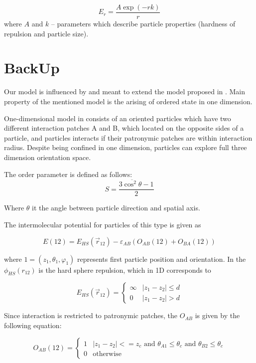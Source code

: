 \documentclass[12pt,a4paper]{article}
\begin{document}
\begin{equation}
E_{r} = \frac{A \exp(-r k)}{r}
\end{equation}
where $A$ and $k$ -- parameters which describe particle properties (hardness of repulsion and particle size).

\section{BackUp}
Our model is influenced by and meant to extend the model proposed in \cite{Marshall2015}. Main property of the mentioned model is the arising of ordered state in one dimension.

One-dimensional model in \cite{Marshall2015} consists of an oriented particles which have two different interaction patches A and B, which located on the opposite sides of a particle, and particles interacts if their patronymic patches are within interaction radius. Despite being confined in one dimension, particles can explore full three dimension orientation space.

The order parameter is defined as follows:
\begin{equation}
S = \frac{3 \overline{\cos^2 \theta} - 1}{2}
\end{equation}

Where $\theta$ it the angle between particle direction and spatial axis.

The intermolecular potential for particles of this type is given as

\begin{equation}
E(12) = E_{HS}(\vec{r}_{12}) - \varepsilon_{AB}(O_{AB}(12) + O_{BA}(12))
\end{equation}

where $1 = (z_1, \theta_1, \varphi_1)$ represents first particle position and orientation. In \cite{Marshall2015} the $\phi_{HS}(r_{12})$ is the hard sphere repulsion, which in 1D corresponds to

\begin{equation}
E_{HS}(\vec{r}_{12}) = \begin{cases}
	\infty &\text{$|z_1 - z_2| \leq d$}\\
   	0 	&\text{$|z_1 - z_2| > d$}
\end{cases}
\end{equation}

Since interaction is restricted to patronymic patches, the $O_{AB}$ is given by the following equation:

\begin{equation}
O_{AB}(12) = \begin{cases}
	1 &\text{$|z_1 - z_2| <= z_c$ and $\theta_{A1} \leq \theta_c$ and $\theta_{B2} \leq \theta_c $}\\
   	0 &\text{otherwise}
\end{cases}
\end{equation}
\end{document}

